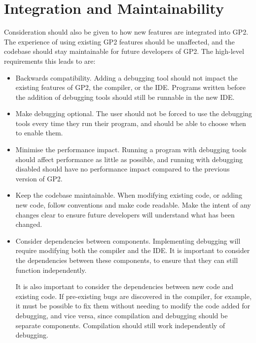 \documentclass[authoryearcitations]{UoYCSproject}
\begin{document}

\section{Integration and Maintainability}
\label{sec:IntegrationAndMaintainability}

Consideration should also be given to how new features are integrated into
GP2. The experience of using existing GP2 features should be unaffected, and the
codebase should stay maintainable for future developers of GP2. The high-level
requirements this leads to are:

\begin{itemize}
    \item Backwards compatibility. Adding a debugging tool should not impact the
          existing features of GP2, the compiler, or the IDE. Programs written
          before the addition of debugging tools should still be runnable in the
          new IDE.

    \item Make debugging optional. The user should not be forced to use the
          debugging tools every time they run their program, and should be able
          to choose when to enable them.

    \item Minimise the performance impact. Running a program with debugging tools
          should affect performance as little as possible, and running with
          debugging disabled should have no performance impact compared to the
          previous version of GP2.

    \item Keep the codebase maintainable. When modifying existing code, or adding
          new code, follow conventions and make code readable. Make the intent
          of any changes clear to ensure future developers will understand what
          has been changed.

    \item Consider dependencies between components. Implementing debugging will
          require modifying both the compiler and the IDE. It is important to
          consider the dependencies between these components, to ensure that
          they can still function independently.

          It is also important to consider the dependencies between new code and
          existing code. If pre-existing bugs are discovered in the compiler,
          for example, it must be possible to fix them without needing to modify
          the code added for debugging, and vice versa, since compilation and
          debugging should be separate components. Compilation should still work
          independently of debugging. 
\end{itemize}
\end{document}
